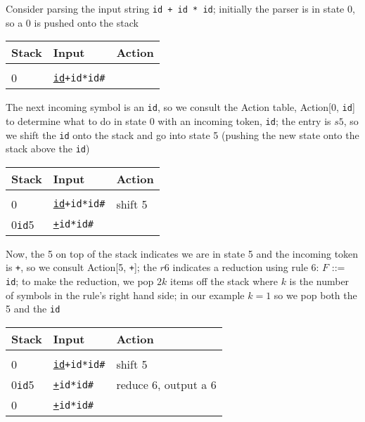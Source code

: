 \documentclass[8pt,a4paper,compress,handout]{beamer}
\begin{document}
\begin{frame}[fragile]
\pause

Consider parsing the input string \lstinline{id + id * id}; initially the parser is in state 0, so a 0 is pushed onto the stack

\begin{table}[H]
\begin{tabular}{lll}
Stack & Input & Action \\ \hline \\
0 & \underline{\lstinline$id$}\lstinline$+id*id#$ &
\end{tabular}
\end{table}

\pause
\bigskip

The next incoming symbol is an \lstinline$id$, so we consult the Action table, Action[0, \lstinline{id}] to determine what to do in state 0 with an incoming token, \lstinline{id}; the entry is $s5$, so we shift the \lstinline{id} onto the stack and go into state 5 (pushing the new state onto the stack above the \lstinline{id})

\begin{table}[H]
\begin{tabular}{lll}
Stack & Input & Action \\ \hline \\
0 & \underline{\lstinline$id$}\lstinline$+id*id#$ & shift 5 \\
0\lstinline$id$5 & \underline{\lstinline$+$}\lstinline$id*id#$ &
\end{tabular}
\end{table}

\pause
\bigskip

Now, the 5 on top of the stack indicates we are in state 5 and the incoming token is \lstinline{+}, so we consult Action[5, \lstinline{+}]; the $r6$ indicates a reduction using rule 6: $F$ ::= \lstinline{id}; to make the reduction, we pop $2k$ items off the stack where $k$ is the number of symbols in the rule's right hand side; in our example $k = 1$ so we pop both the 5 and the \lstinline{id}

\begin{table}[H]
\begin{tabular}{lll}
Stack & Input & Action \\ \hline \\
0 & \underline{\lstinline$id$}\lstinline$+id*id#$ & shift 5 \\
0\lstinline$id$5 & \underline{\lstinline$+$}\lstinline$id*id#$ & reduce 6, output a 6 \\
0 & \underline{\lstinline$+$}\lstinline$id*id#$ &
\end{tabular}
\end{table}
\end{frame}
\end{document}
